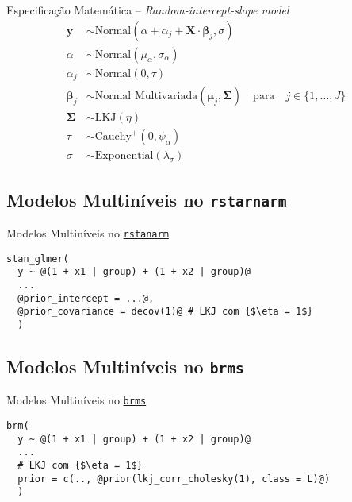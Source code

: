 \begin{frame}{Especificação Matemática -- \textit{Random-intercept-slope model}}
  $$
  \begin{aligned}
  \mathbf{y} &\sim \text{Normal}\left( \alpha + \alpha_j + \mathbf{X} \cdot \boldsymbol{\beta}_j, \sigma \right) \\
  \alpha &\sim \text{Normal}(\mu_\alpha, \sigma_\alpha) \\
  \alpha_j &\sim \text{Normal}(0, \tau) \\
  \boldsymbol{\beta}_j &\sim \text{Normal Multivariada}(\boldsymbol{\mu}_j, \boldsymbol{\Sigma})
    \quad \text{para}\quad j \in \{ 1, \dots, J \} \\
  \boldsymbol{\Sigma} &\sim \text{LKJ}(\eta) \\
  \tau &\sim \text{Cauchy}^+(0, \psi_{\alpha})\\
  \sigma &\sim \text{Exponential}(\lambda_\sigma)
  \end{aligned}
  $$
\end{frame}

\subsection{Modelos Multiníveis no \texttt{rstarnarm}}
\begin{frame}[fragile]{Modelos Multiníveis no \href{http://mc-stan.org/rstanarm/}{\texttt{rstanarm}}}
  \begin{lstlisting}[escapeinside=\{\}]
stan_glmer(
  y ~ @(1 + x1 | group) + (1 + x2 | group)@
  ...
  @prior_intercept = ...@,
  @prior_covariance = decov(1)@ # LKJ com {$\eta = 1$}
  )
  \end{lstlisting}
\end{frame}

\subsection{Modelos Multiníveis no \texttt{brms}}
\begin{frame}[fragile]{Modelos Multiníveis no \href{https://paul-buerkner.github.io/brms/}{\texttt{brms}}}
  \begin{lstlisting}[escapeinside=\{\}]
brm(
  y ~ @(1 + x1 | group) + (1 + x2 | group)@
  ...
  # LKJ com {$\eta = 1$}
  prior = c(.., @prior(lkj_corr_cholesky(1), class = L)@)
  )
  \end{lstlisting}
\end{frame}
